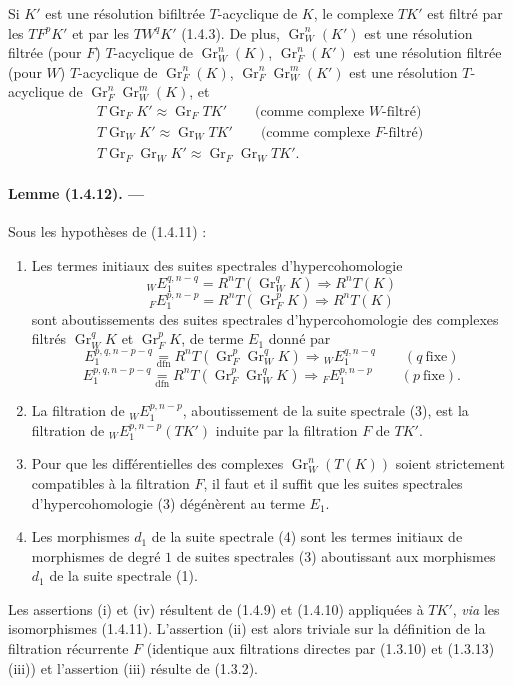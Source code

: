 \documentclass[10pt]{article}
\newcommand{\Gr}{\operatorname{Gr}}
\begin{document}
Si $K'$ est une résolution bifiltrée $T$-acyclique de $K$, le complexe $TK'$ est filtré par les $TF^pK'$ et par les $TW^qK'$ (1.4.3). De plus, $\Gr_W^n(K')$ est une résolution filtrée (pour $F$) $T$-acyclique de $\Gr_W^n(K)$, $\Gr_F^n(K')$ est une résolution filtrée (pour $W$) $T$-acyclique de $\Gr_F^n(K)$, $\Gr_F^n\Gr_W^m(K')$ est une résolution $T$-acyclique de $\Gr_F^n\Gr_W^m(K)$, et
\[
\begin{gathered}
T\Gr_FK'\approx\Gr_FTK'\qquad\text{(comme complexe $W$-filtré)}\\
T\Gr_WK'\approx\Gr_WTK'\qquad\text{(comme complexe $F$-filtré)}\\
T\Gr_F\Gr_WK'\approx\Gr_F\Gr_WTK'.
\end{gathered}
\]

\paragraph{Lemme (1.4.12). ---} Sous les hypothèses de (1.4.11) :
\begin{enumerate}[label=(\roman*)]
\item Les termes initiaux des suites spectrales d'hypercohomologie
\[
\tag{1}
{}_WE_1^{q,n-q}=R^nT(\Gr_W^qK)\Rightarrow R^nT(K)
\]
\[
\tag{2}
{}_FE_1^{p,n-p}=R^nT(\Gr_F^pK)\Rightarrow R^nT(K)
\]
sont aboutissements des suites spectrales d'hypercohomologie des complexes filtrés $\Gr_W^qK$ et $\Gr_F^pK$, de terme $E_1$ donné par
\[
\tag{3}
E_1^{p,q,n-p-q}\underset{\mathrm{dfn}}{=}R^nT(\Gr_F^p\Gr_W^qK)\Rightarrow {}_WE_1^{q,n-q}\qquad(q\ \text{fixe})
\]
\[
\tag{4}
E_1^{p,q,n-p-q}\underset{\mathrm{dfn}}{=}R^nT(\Gr_F^p\Gr_W^qK)\Rightarrow {}_FE_1^{p,n-p}\qquad(p\ \text{fixe}).
\]
\item La filtration de ${}_WE_1^{p,n-p}$, aboutissement de la suite spectrale (3), est la filtration de ${}_WE_1^{p,n-p}(TK')$ induite par la filtration $F$ de $TK'$.
\item Pour que les différentielles des complexes $\Gr_W^n(T(K))$ soient strictement compatibles à la filtration $F$, il faut et il suffit que les suites spectrales d'hypercohomologie (3) dégénèrent au terme $E_1$.
\item Les morphismes $d_1$ de la suite spectrale (4) sont les termes initiaux de morphismes de degré $1$ de suites spectrales (3) aboutissant aux morphismes $d_1$ de la suite spectrale (1).
\end{enumerate}
Les assertions (i) et (iv) résultent de (1.4.9) et (1.4.10) appliquées à $TK'$, \emph{via} les isomorphismes (1.4.11). L'assertion (ii) est alors triviale sur la définition de la filtration récurrente $F$ (identique aux filtrations directes par (1.3.10) et (1.3.13) (iii)) et l'assertion (iii) résulte de (1.3.2).
\end{document}

